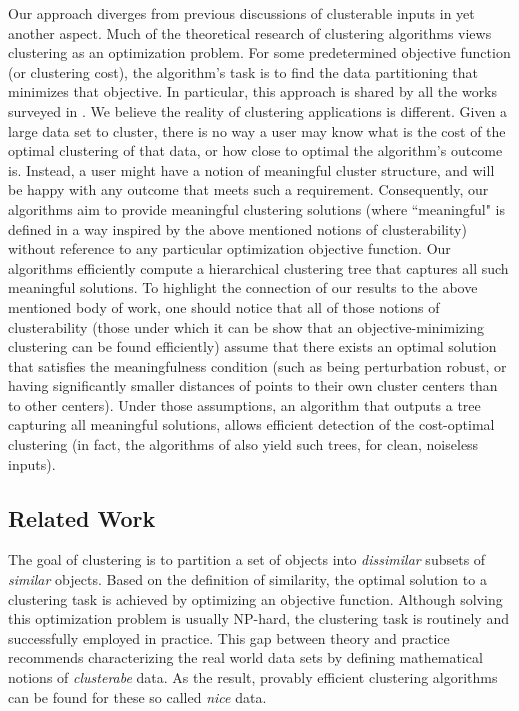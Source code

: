 \documentclass[anon,12pt]{colt2016} %
\begin{document}
Our approach diverges from previous discussions of clusterable inputs in yet another aspect. Much of the theoretical research of clustering algorithms views clustering as an optimization problem. For some predetermined objective function (or clustering cost), the algorithm's task is to find the data partitioning that minimizes that objective. In particular, this approach is shared by all the works surveyed in \cite{ben2015computational}. We believe the reality of clustering applications is different. Given a large data set to cluster, there is no way a user may know what is the cost of the optimal clustering of that data, or how close to optimal the algorithm's outcome is. Instead, a user might have a notion of meaningful cluster structure, and will be happy with any outcome that meets such a requirement. Consequently, our algorithms aim to provide meaningful clustering solutions (where ``meaningful" is defined in a way inspired by the above mentioned notions of clusterability) without reference to any particular optimization objective function. Our algorithms efficiently compute a hierarchical clustering tree that captures all such meaningful solutions. To highlight the connection of our results to the above mentioned body of work, one should notice that all of those notions of clusterability (those under which it can be show that an objective-minimizing clustering can be found efficiently) assume that there exists an optimal solution that satisfies the meaningfulness condition (such as being perturbation robust, or having significantly smaller distances of points to their own cluster centers than to other centers). Under those assumptions, an algorithm that outputs a tree capturing all meaningful solutions, allows efficient detection of the cost-optimal clustering (in fact, the algorithms of \cite{balcan2012clustering} also yield such trees, for clean, noiseless inputs).

\subsection{Related Work}
The goal of clustering is to partition a set of objects into {\em dissimilar} subsets of {\em similar} objects. Based on the definition of similarity, the optimal solution to a clustering task is achieved by optimizing an objective function. Although solving this optimization problem is usually NP-hard, the clustering task is routinely and successfully employed in practice. This gap between theory and practice recommends characterizing the real world data sets by defining mathematical notions of {\em clusterabe} data. As the result, provably efficient clustering algorithms can be found for these so called {\em nice} data.  
\end{document}
